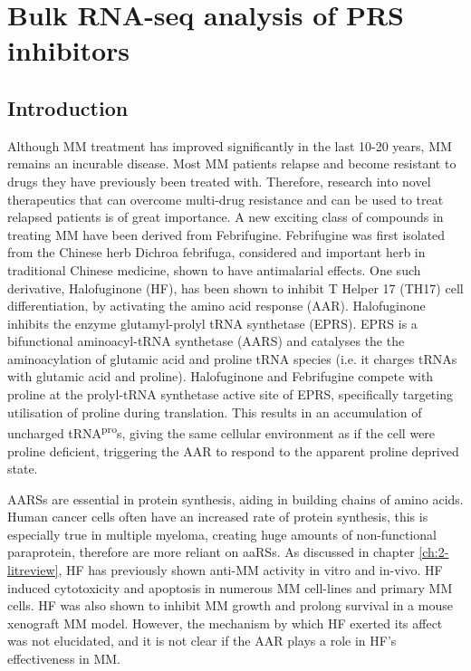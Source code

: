 \chapter{\label{ch:5-bulk}Bulk RNA-seq analysis of PRS inhibitors}


\section{Introduction}
Although MM treatment has improved significantly in the last 10-20 years, MM remains an incurable disease.
Most MM patients relapse and become resistant to drugs they have previously been treated with.
Therefore, research into novel therapeutics that can overcome multi-drug resistance and can be used to treat relapsed patients is of great importance.
A new exciting class of compounds in treating MM have been derived from Febrifugine.
Febrifugine was first isolated from the Chinese herb Dichroa febrifuga, considered and important herb in traditional Chinese medicine, shown to have antimalarial effects.
One such derivative, Halofuginone (HF), has been shown to inhibit T Helper 17 (TH17) cell differentiation, by activating the amino acid response (AAR)\cite{sundrud2009halofuginone}.
Halofuginone inhibits the enzyme glutamyl-prolyl tRNA synthetase (EPRS).
EPRS is a bifunctional aminoacyl-tRNA synthetase (AARS) and catalyses the the aminoacylation of glutamic acid and proline tRNA species (i.e. it charges tRNAs with glutamic acid and proline).
Halofuginone and Febrifugine compete with proline at the prolyl-tRNA synthetase active site of EPRS, specifically targeting utilisation of proline during translation\cite{keller2012halofuginone}.
This results in an accumulation of uncharged tRNA\textsuperscript{pro}s, giving the same cellular environment as if the cell were proline deficient, triggering the AAR to respond to the apparent proline deprived state.

AARSs are essential in protein synthesis, aiding in building chains of amino acids.
Human cancer cells often have an increased rate of protein synthesis, this is especially true in multiple myeloma, creating huge amounts of non-functional paraprotein, therefore are more reliant on aaRSs.
As discussed in chapter \ref{ch:2-litreview}, HF has previously shown anti-MM activity in vitro and in-vivo.
HF induced cytotoxicity and apoptosis in numerous MM cell-lines and primary MM cells.
HF was also shown to inhibit MM growth and prolong survival in a mouse xenograft MM model.
However, the mechanism by which HF exerted its affect was not elucidated, and it is not clear if the AAR plays a role in HF's effectiveness in MM.

